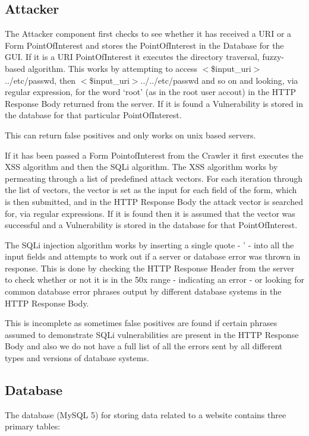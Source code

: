 \documentclass[12pt,a4paper]{article}
\begin{document}
\subsection{Attacker}
The Attacker component first checks to see whether it has received a URI or a Form PointOfInterest and stores the PointOfInterest in the Database for the GUI.  If it is a URI PointOfInterest it executes the directory traversal, fuzzy-based algorithm.  This works by attempting to access $<$\$input\_uri$>$../etc/passwd, then $<$\$input\_uri$>$../../etc/passwd and so on and looking, via regular expression, for the word `root' (as in the root user accout) in the HTTP Response Body returned from the server.  If it is found a Vulnerability is stored in the database for that particular PointOfInterest.

This can return false positives and only works on unix based servers.

If it has been passed a Form PointofInterest from the Crawler it first executes the XSS algorithm and then the SQLi algorithm.  The XSS algorithm works by permeating through a list of predefined attack vectors. For each iteration through the list of vectors, the vector is set as the input for each field of the form, which is then submitted, and in the HTTP Response Body the attack vector is searched for, via regular expressions.  If it is found then it is assumed that the vector was successful and a Vulnerability is stored in the database for that PointOfInterest.

The SQLi injection algorithm works by inserting a single quote - ' - into all the input fields and attempts to work out if a server or database error was thrown in response.  This is done by checking the HTTP Response Header from the server to check whether or not it is in the 50x range - indicating an error - or looking for common database error phrases output by different database systems in the HTTP Response Body.  

This is incomplete as sometimes false positives are found if certain phrases assumed to demonstrate SQLi vulnerabilities are present in the HTTP Response Body and also we do not have a full list of all the errors sent by all different types and versions of database systems.

\subsection{Database}
The database (MySQL 5) for storing data related to a website contains three primary tables:
\end{document}
